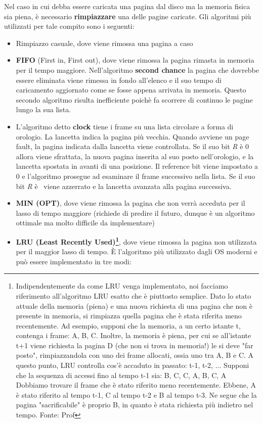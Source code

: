 \documentclass{article}
\begin{document}
Nel caso in cui debba essere caricata una pagina dal disco ma la memoria fisica sia piena, è necessario \textbf{rimpiazzare} una delle pagine caricate. Gli algoritmi più utilizzati per tale compito sono i seguenti:
\begin{itemize}
    \item Rimpiazzo casuale, dove viene rimossa una pagina a caso
    \item \textbf{FIFO} (First in, First out), dove viene rimossa la pagina rimasta in memoria per
    il tempo maggiore. Nell'algoritmo \textbf{second chance} la pagina che dovrebbe essere eliminata viene rimessa in fondo all'elenco e il suo tempo di caricamento aggiornato come se fosse appena arrivata in memoria. Questo secondo algoritmo risulta inefficiente poichè fa scorrere di continuo le pagine lungo la sua lista.
    \item L'algoritmo detto \textbf{clock} tiene i frame su una lista circolare a forma di orologio. La lancetta indica la pagina più vecchia. Quando avviene un page fault, la pagina indicata dalla lancetta viene controllata. Se il suo bit \textit{R} è 0 allora viene sfrattata, la nuova pagina inserita al suo posto nell'orologio, e la lancetta spostata in avanti di una posizione. Il reference bit viene impostato a 0 e l'algoritmo prosegue ad esaminare il frame successivo nella lista. Se il suo bit \textit{R} è \ viene azzerrato e la lancetta avanzata alla pagina successiva. 
    \item \textbf{MIN (OPT)}, dove viene rimossa la pagina che non verrà acceduta per il lasso di tempo maggiore (richiede di predire il futuro, dunque è un algoritmo ottimale ma molto difficile da implementare)
    \item \textbf{LRU (Least Recently Used)\footnote{Indipendentemente da come LRU venga implementato, noi facciamo riferimento all'algoritmo LRU esatto che è piuttosto semplice. Dato lo stato attuale della memoria (piena) e una nuova richiesta di una pagina che non è presente in memoria, si rimpiazza quella pagina che è stata riferita meno recentemente. 
    Ad esempio, supponi che la memoria, a un certo istante t, contenga i frame: A, B, C. Inoltre, la memoria è piena, per cui se all'istante t+1 viene richiesta la pagina D (che non si trova in memoria!) le si deve "far posto", rimpiazzandola con uno dei frame allocati, ossia uno tra A, B e C.
    A questo punto, LRU controlla cos'è accaduto in passato: t-1, t-2, ...
    Supponi che la sequenza di accessi fino al tempo t-1 sia: B, C, C, A, B, C, A
    Dobbiamo trovare il frame che è stato riferito meno recentemente. Ebbene, A è stato riferito al tempo t-1, C al tempo t-2 e B al tempo t-3. Ne segue che la pagina "sacrificabile" è proprio B, in quanto è stata richiesta più indietro nel tempo. Fonte: Prof}}, dove viene rimossa la pagina non utilizzata per il maggior lasso di tempo. È l'algoritmo più utilizzato dagli OS moderni e può essere implementato in tre modi:

\end{itemize}
\end{document}
